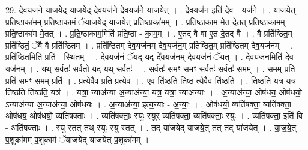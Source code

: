 \documentclass[17pt]{extarticle}
\begin{document}
29. दे॒व॒यज॑ने याजयेद् याजयेद् देव॒यज॑ने देव॒यज॑ने याजयेत् । . दे॒व॒यज॑न॒ इति॑ देव - यज॑ने । . या॒ज॒ये॒त् प्र॒ति॒ष्ठाका॑मम् प्रति॒ष्ठाका॑मं ॅयाजयेद् याजयेत् प्रति॒ष्ठाका॑मम् । . प्र॒ति॒ष्ठाका॑म मे॒त दे॒तत् प्र॑ति॒ष्ठाका॑मम् प्रति॒ष्ठाका॑म मे॒तत् । . प्र॒ति॒ष्ठाका॑म॒मिति॑ प्रति॒ष्ठा - का॒म॒म् । . ए॒तद् वै वा ए॒त दे॒तद् वै । . वै प्रति॑ष्ठित॒म् प्रति॑ष्ठितं॒ ॅवै वै प्रति॑ष्ठितम् । . प्रति॑ष्ठितम् देव॒यज॑नम् देव॒यज॑न॒म् प्रति॑ष्ठित॒म् प्रति॑ष्ठितम् देव॒यज॑नम् । . प्रति॑ष्ठित॒मिति॒ प्रति॑ - स्थि॒त॒म् । . दे॒व॒यज॑नं॒ ॅयद् यद् दे॑व॒यज॑नम् देव॒यज॑नं॒ ॅयत् । . दे॒व॒यज॑न॒मिति॑ देव - यज॑नम् । . यथ् स॒र्वतः॑ स॒र्वतो॒ यद् यथ् स॒र्वतः॑ । . स॒र्वतः॑ स॒मꣳ स॒मꣳ स॒र्वतः॑ स॒र्वतः॑ स॒मम् । . स॒मम् प्रति॒ प्रति॑ स॒मꣳ स॒मम् प्रति॑ । . प्रत्ये॒वैव प्रति॒ प्रत्ये॒व । . ए॒व ति॑ष्ठति तिष्ठ त्ये॒वैव ति॑ष्ठति । . ति॒ष्ठ॒ति॒ यत्र॒ यत्र॑ तिष्ठति तिष्ठति॒ यत्र॑ । . यत्रा॒ न्या‌अ॑न्या अ॒न्या‌अ॑न्या॒ यत्र॒ यत्रा॒ न्या‌अ॑न्याः । . अ॒न्या‌अ॑न्या॒ ओष॑धय॒ ओष॑धयो॒ ऽन्या‌अ॑न्या अ॒न्या‌अ॑न्या॒ ओष॑धयः । . अ॒न्या‌अ॑न्या॒ इत्य॒न्याः - अ॒न्याः॒ । . ओष॑धयो॒ व्यति॑षक्ता॒ व्यति॑षक्ता॒ ओष॑धय॒ ओष॑धयो॒ व्यति॑षक्ताः । . व्यति॑षक्ताः॒ स्युः स्युर् व्यति॑षक्ता॒ व्यति॑षक्ताः॒ स्युः । . व्यति॑षक्ता॒ इति॑ वि - अति॑षक्ताः । . स्यु स्तत् तथ् स्युः स्यु स्तत् । . तद् या॑जयेद् याजये॒त् तत् तद् या॑जयेत् । . या॒ज॒ये॒त् प॒शुका॑मम् प॒शुका॑मं ॅयाजयेद् याजयेत् प॒शुका॑मम् । \newline
\end{document}

